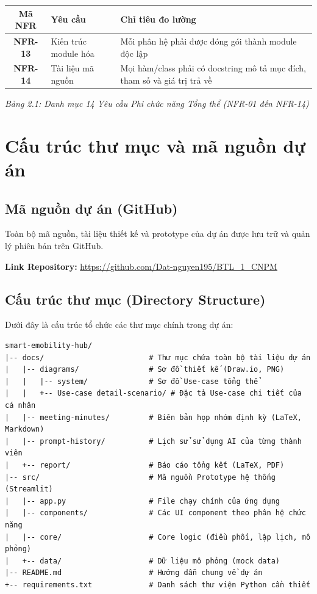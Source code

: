 \documentclass[12pt,a4paper]{report}
\begin{document}
\begin{longtable}{|c|p{4cm}|p{7cm}|}
    \hline
    \textbf{Mã NFR} & \textbf{Yêu cầu} & \textbf{Chỉ tiêu đo lường} \\
    \hline
    \textbf{NFR-13} & Kiến trúc module hóa & Mỗi phân hệ phải được đóng gói thành module độc lập \\
    \hline
    \textbf{NFR-14} & Tài liệu mã nguồn & Mọi hàm/class phải có docstring mô tả mục đích, tham số và giá trị trả về \\
    \hline
\end{longtable}
\begin{center}
\textit{Bảng 2.1: Danh mục 14 Yêu cầu Phi chức năng Tổng thể (NFR-01 đến NFR-14)}
\end{center}


\appendix
\chapter{Cấu trúc thư mục và mã nguồn dự án}

\section{Mã nguồn dự án (GitHub)}
Toàn bộ mã nguồn, tài liệu thiết kế và prototype của dự án được lưu trữ và quản lý phiên bản trên GitHub. 

\textbf{Link Repository:} \url{https://github.com/Dat-nguyen195/BTL_1_CNPM}

\section{Cấu trúc thư mục (Directory Structure)}
Dưới đây là cấu trúc tổ chức các thư mục chính trong dự án:

\begin{verbatim}
smart-emobility-hub/
|-- docs/                        # Thư mục chứa toàn bộ tài liệu dự án
|   |-- diagrams/                # Sơ đồ thiết kế (Draw.io, PNG)
|   |   |-- system/              # Sơ đồ Use-case tổng thể
|   |   +-- Use-case detail-scenario/ # Đặc tả Use-case chi tiết của cá nhân
|   |-- meeting-minutes/         # Biên bản họp nhóm định kỳ (LaTeX, Markdown)
|   |-- prompt-history/          # Lịch sử sử dụng AI của từng thành viên
|   +-- report/                  # Báo cáo tổng kết (LaTeX, PDF)
|-- src/                         # Mã nguồn Prototype hệ thống (Streamlit)
|   |-- app.py                   # File chạy chính của ứng dụng
|   |-- components/              # Các UI component theo phân hệ chức năng
|   |-- core/                    # Core logic (điều phối, lập lịch, mô phỏng)
|   +-- data/                    # Dữ liệu mô phỏng (mock data)
|-- README.md                    # Hướng dẫn chung về dự án
+-- requirements.txt             # Danh sách thư viện Python cần thiết
\end{verbatim}
\end{document}

